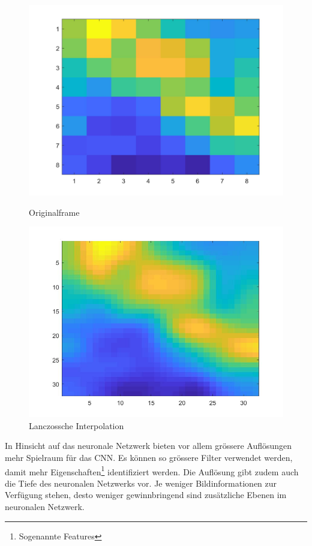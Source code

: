 \begin{figure}[!ht]
	\centering
	\begin{minipage}[c]{0.49\linewidth}
	\centering
	\includegraphics[width=1.0\linewidth]{fig/interpol_1}
	\caption[Originalframe]{Originalframe}
	\label{fig:interpol1}
	\end{minipage}
	\begin{minipage}[c]{0.49\linewidth}
		\centering
	\includegraphics[width=1.0\linewidth]{fig/interpol_2}
	\caption[Lanczossche Interpolation]{Lanczossche Interpolation}
	\label{fig:interpol2}
	\end{minipage}
\end{figure}

In Hinsicht auf das neuronale Netzwerk bieten vor allem grössere Auflösungen mehr Spielraum für das \ac{CNN}. Es können so grössere Filter verwendet werden, damit mehr Eigenschaften\footnote[23]{Sogenannte Features} identifiziert werden. Die Auflösung gibt zudem auch die Tiefe des neuronalen Netzwerks vor. Je weniger Bildinformationen zur Verfügung stehen, desto weniger gewinnbringend sind zusätzliche Ebenen im neuronalen Netzwerk. 

